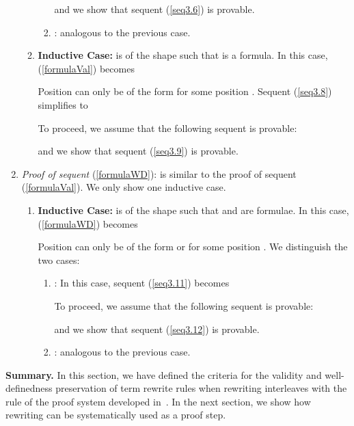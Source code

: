 \documentclass[copyright]{eptcs}
\begin{document}
\begin{enumerate}
\begin{enumerate}
\begin{enumerate}
\begin{small}
\end{small}
and we show that sequent (\ref{seq3.6}) is provable.
\item : analogous to the previous case.
\end{enumerate}
\item \textbf{Inductive Case:}  is of the shape  such that  is a formula. In this case, (\ref{formulaVal}) becomes
\begin{small}

\end{small}
Position  can only be of the form  for some position . Sequent (\ref{seq3.8}) simplifies to
\begin{small}

\end{small}
To proceed, we assume that the following sequent is provable:
\begin{small}

\end{small}
and we show that sequent (\ref{seq3.9}) is provable.
\end{enumerate}
\item \textit{Proof of sequent} (\ref{formulaWD}):
is similar to the proof of sequent (\ref{formulaVal}). We only show one inductive case.
\begin{enumerate}
\item \textbf{Inductive Case:}  is of the shape  such that  and  are formulae. In this case, (\ref{formulaWD}) becomes
\begin{small}

\end{small}
Position  can only be of the form  or  for some position . We distinguish the two cases:
\begin{enumerate}
\item : In this case, sequent (\ref{seq3.11}) becomes
\begin{small}

\end{small}
To proceed, we assume that the following sequent is provable:
\begin{small}

\end{small}
and we show that sequent (\ref{seq3.12}) is provable.
\item : analogous to the previous case.
\end{enumerate}
\end{enumerate}
\end{enumerate}

\textbf{Summary.} In this section, we have defined the criteria for the validity and well-definedness preservation of term rewrite rules when rewriting interleaves with the rule of the proof system developed in~\cite{icfemMehta08}. In the next section, we show how rewriting can be systematically used as a proof step.
\end{document}
